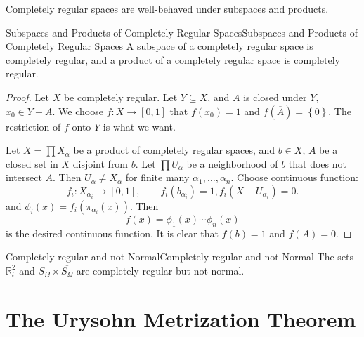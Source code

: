 \documentclass[../main.tex]{subfiles}
\begin{document}
Completely regular spaces are well-behaved under subspaces and products.
\begin{theorem}{Subspaces and Products of Completely Regular Spaces}{Subspaces and Products of Completely Regular Spaces}
	A subspace of a completely regular space is completely regular, and a product of a completely regular space is completely regular.
\end{theorem}
\begin{proof}
	Let $X$ be completely regular. Let $Y \subseteq X$, and $A$ is closed under $Y$, $x_0\in Y-A$. We choose $f:X \rightarrow [0,1]$ that $f(x_0)=1$ and $f(\overline{A}) = \left\{ 0 \right\}$. The restriction of $f$ onto $Y$ is what we want.
	
	Let $X = \prod X_{\alpha}$ be a product of completely regular spaces, and $b\in X$, $A$ be a closed set in $X$ disjoint from $b$. Let $\prod U_{\alpha}$ be a neighborhood of $b$ that does not intersect $A$. Then $U_{\alpha}\neq X_{\alpha}$ for finite many $\alpha_1, \ldots ,\alpha_n$. Choose continuous function:
	\begin{equation*}
		f_i : X_{\alpha_i} \rightarrow [0,1], \qquad f_i(b_{\alpha_i}) = 1, f_i(X-U_{\alpha_i}) = 0.
	\end{equation*}
	and $\phi_i(x) = f_i(\pi_{\alpha_i}(x))$. Then
	\begin{equation*}
		f(x) = \phi_1(x) \cdots \phi_n(x)
	\end{equation*}
	is the desired continuous function. It is clear that $f(b) = 1$ and $f(A) = 0$.
\end{proof}

\begin{example}{Completely regular and not Normal}{Completely regular and not Normal}
The sets $\mathbb{R}_l^2$ and $S_{\Omega}\times \overline{S_{\Omega}}$ are completely regular but not normal.
\end{example}

\section{The Urysohn Metrization Theorem}
\end{document}
